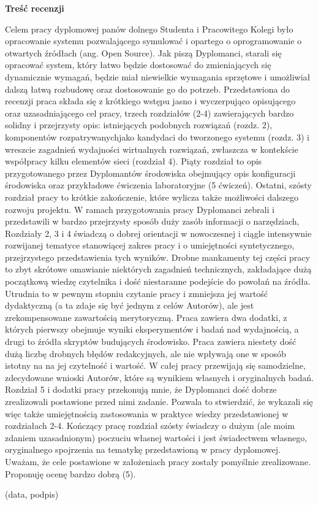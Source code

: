 \centerline{\bf Treść recenzji}
   Celem pracy dyplomowej panów dolnego Studenta i Pracowitego Kolegi  było
opracowanie systemu pozwalającego symulować  i opartego o oprogramowanie o
otwartych źródłach (ang. Open Source). Jak piszą Dyplomanci, starali się opracować
system, który łatwo będzie dostosować do zmieniających się dynamicznie wymagań,
będzie miał niewielkie wymagania sprzętowe i umożliwiał dalszą łatwą rozbudowę oraz
dostosowanie go do potrzeb.
Przedstawiona do recenzji praca składa się z krótkiego wstępu jasno i
wyczerpująco opisującego oraz uzasadniającego cel pracy, trzech rozdziałów (2-4)
zawierających bardzo solidny i przejrzysty opis: istniejących podobnych
rozwiązań (rozdz. 2), komponentów rozpatrywanychjako kandydaci do
tworzonego systemu (rozdz. 3) i wreszcie zagadnień wydajności wirtualnych
rozwiązań, zwłaszcza w kontekście współpracy  kilku elementów
 sieci (rozdział 4). Piąty rozdział to opis przygotowanego przez
Dyplomantów środowiska obejmujący opis konfiguracji
środowiska oraz przykładowe ćwiczenia laboratoryjne (5 ćwiczeń). Ostatni, szósty
rozdział pracy to krótkie zakończenie, które wylicza także możliwości dalszego
rozwoju projektu. W ramach przygotowania pracy Dyplomanci zebrali i przedstawili w
bardzo przejrzysty sposób duży zasób informacji o narzędziach, Rozdziały 2, 3 i 4 świadczą o dobrej orientacji
w nowoczesnej i ciągle intensywnie rozwijanej tematyce stanowiącej
zakres pracy i o umiejętności syntetycznego, przejrzystego przedstawienia tych
wyników. Drobne  mankamenty tej części pracy to zbyt skrótowe omawianie
niektórych zagadnień technicznych, zakładające dużą początkową wiedzę czytelnika
i dość niestaranne podejście do powołań na źródła.
Utrudnia to w pewnym stopniu czytanie pracy i zmniejsza jej wartość dydaktyczną
(a ta zdaje się być jednym z celów Autorów), ale jest zrekompensowane zawartością
merytoryczną. Praca zawiera dwa dodatki, z których pierwszy obejmuje wyniki
eksperymentów i badań nad wydajnością, a drugi to źródła
skryptów budujących środowisko. Praca
zawiera niestety dość dużą liczbę drobnych błędów redakcyjnych, ale nie wpływają
one w sposób istotny na na jej czytelność i wartość. W całej pracy przewijają
się samodzielne, zdecydowane wnioski Autorów, które są wynikiem własnych i
oryginalnych badań.  Rozdział 5 i dodatki pracy przekonują mnie, że Dyplomanci dość
dobrze zrealizowali postawione przed nimi zadanie. Pozwala to stwierdzić, że
wykazali się więc także umiejętnością zastosowania w praktyce wiedzy
przedstawionej w rozdziałach 2-4. Kończący pracę rozdział szósty świadczy o
dużym (ale moim zdaniem uzasadnionym) poczuciu własnej wartości i jest
świadectwem własnego, oryginalnego spojrzenia na tematykę przedstawioną w pracy
dyplomowej. Uważam, że cele postawione w założeniach pracy zostały pomyślnie
zrealizowane. Proponuję ocenę bardzo dobrą (5).

\vskip 1cm
{
\raggedleft
(data, podpis)\kern1cm

}